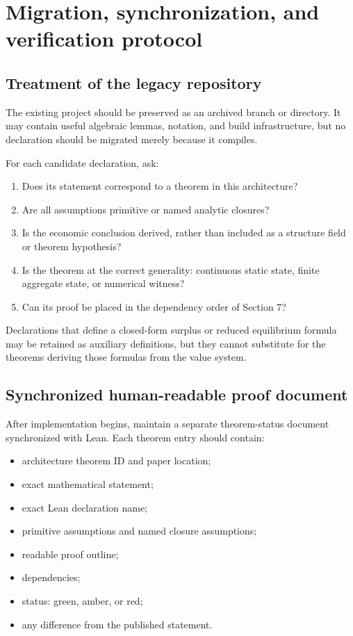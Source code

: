 \documentclass[11pt]{article}
\begin{document}
\newpage
\section{Migration, synchronization, and verification protocol}

\subsection{Treatment of the legacy repository}

The existing project should be preserved as an archived branch or directory. It may contain useful algebraic lemmas, notation, and build infrastructure, but no declaration should be migrated merely because it compiles.

For each candidate declaration, ask:
\begin{enumerate}
\item Does its statement correspond to a theorem in this architecture?
\item Are all assumptions primitive or named analytic closures?
\item Is the economic conclusion derived, rather than included as a structure field or theorem hypothesis?
\item Is the theorem at the correct generality: continuous static state, finite aggregate state, or numerical witness?
\item Can its proof be placed in the dependency order of Section 7?
\end{enumerate}

Declarations that define a closed-form surplus or reduced equilibrium formula may be retained as auxiliary definitions, but they cannot substitute for the theorems deriving those formulas from the value system.

\subsection{Synchronized human-readable proof document}

After implementation begins, maintain a separate theorem-status document synchronized with Lean. Each theorem entry should contain:
\begin{itemize}
\item architecture theorem ID and paper location;
\item exact mathematical statement;
\item exact Lean declaration name;
\item primitive assumptions and named closure assumptions;
\item readable proof outline;
\item dependencies;
\item status: green, amber, or red;
\item any difference from the published statement.
\end{itemize}
\end{document}
